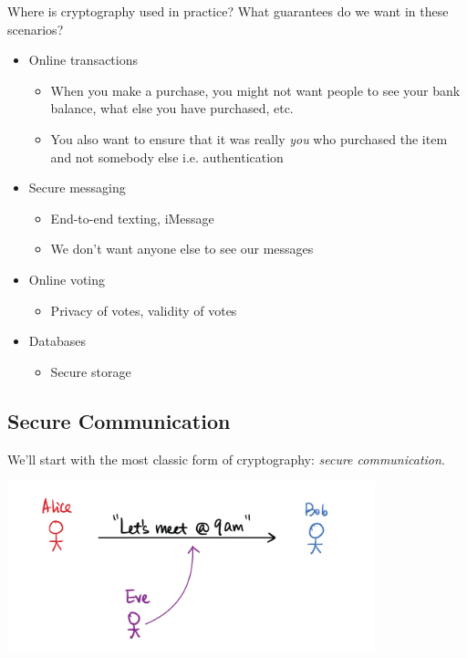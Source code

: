 \begin{ques*}
    Where is cryptography used in practice? What guarantees do we want in these scenarios?
\end{ques*}
\begin{itemize}
    \item Online transactions
          \begin{itemize}
              \item When you make a purchase, you might not want people to see your bank balance, what else you have purchased, etc.
              \item You also want to ensure that it was really \emph{you} who purchased the item and not somebody else i.e. authentication
          \end{itemize}
    \item Secure messaging
        \begin{itemize}
            \item End-to-end texting, iMessage
            \item We don't want anyone else to see our messages
        \end{itemize}
    \item Online voting
        \begin{itemize}
            \item Privacy of votes, validity of votes
        \end{itemize}
    \item Databases
        \begin{itemize}
            \item Secure storage
        \end{itemize}
\end{itemize}

\subsection{Secure Communication}
We'll start with the most classic form of cryptography: \emph{secure communication}.

\begin{center}
    \includegraphics[width=0.8\textwidth]{images/2023-01-26/secure_computation.png}
\end{center}

